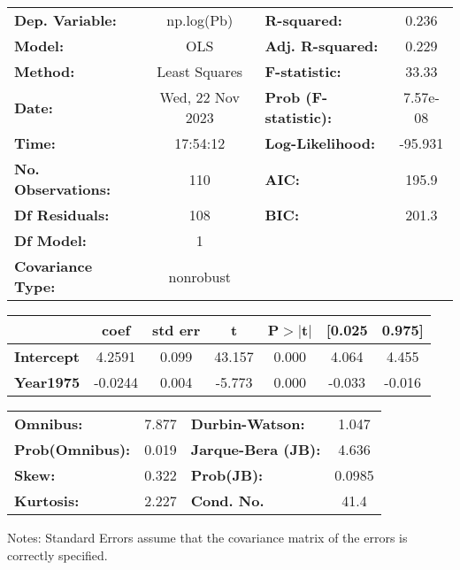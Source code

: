 \begin{center}
\begin{tabular}{lclc}
\toprule
\textbf{Dep. Variable:}    &    np.log(Pb)    & \textbf{  R-squared:         } &     0.236   \\
\textbf{Model:}            &       OLS        & \textbf{  Adj. R-squared:    } &     0.229   \\
\textbf{Method:}           &  Least Squares   & \textbf{  F-statistic:       } &     33.33   \\
\textbf{Date:}             & Wed, 22 Nov 2023 & \textbf{  Prob (F-statistic):} &  7.57e-08   \\
\textbf{Time:}             &     17:54:12     & \textbf{  Log-Likelihood:    } &   -95.931   \\
\textbf{No. Observations:} &         110      & \textbf{  AIC:               } &     195.9   \\
\textbf{Df Residuals:}     &         108      & \textbf{  BIC:               } &     201.3   \\
\textbf{Df Model:}         &           1      & \textbf{                     } &             \\
\textbf{Covariance Type:}  &    nonrobust     & \textbf{                     } &             \\
\bottomrule
\end{tabular}
\begin{tabular}{lcccccc}
                   & \textbf{coef} & \textbf{std err} & \textbf{t} & \textbf{P$> |$t$|$} & \textbf{[0.025} & \textbf{0.975]}  \\
\midrule
\textbf{Intercept} &       4.2591  &        0.099     &    43.157  &         0.000        &        4.064    &        4.455     \\
\textbf{Year1975}  &      -0.0244  &        0.004     &    -5.773  &         0.000        &       -0.033    &       -0.016     \\
\bottomrule
\end{tabular}
\begin{tabular}{lclc}
\textbf{Omnibus:}       &  7.877 & \textbf{  Durbin-Watson:     } &    1.047  \\
\textbf{Prob(Omnibus):} &  0.019 & \textbf{  Jarque-Bera (JB):  } &    4.636  \\
\textbf{Skew:}          &  0.322 & \textbf{  Prob(JB):          } &   0.0985  \\
\textbf{Kurtosis:}      &  2.227 & \textbf{  Cond. No.          } &     41.4  \\
\bottomrule
\end{tabular}
\end{center}

Notes: \newline
 [1] Standard Errors assume that the covariance matrix of the errors is correctly specified.